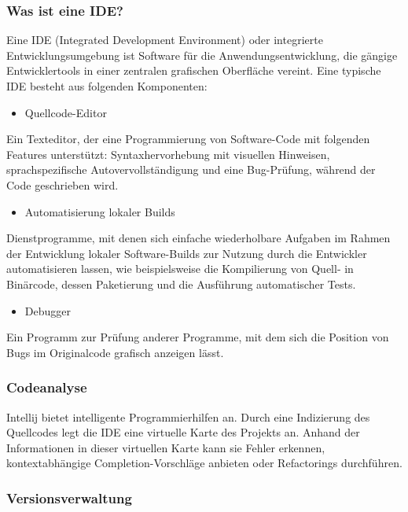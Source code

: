 \subsubsection{Was ist eine IDE?}

Eine IDE (Integrated Development Environment) oder integrierte Entwicklungsumgebung ist Software für die Anwendungsentwicklung, 
die gängige Entwicklertools in einer zentralen grafischen Oberfläche vereint. Eine typische IDE besteht aus folgenden Komponenten:
\cite{sysarch-intellij-2}
\begin{itemize}
 \item Quellcode-Editor 
\end{itemize}
Ein Texteditor, der eine Programmierung von Software-Code mit folgenden Features unterstützt: 
Syntaxhervorhebung mit visuellen Hinweisen, sprachspezifische Autovervollständigung und eine Bug-Prüfung, während der Code geschrieben wird.
\cite{sysarch-intellij-2}
\begin{itemize}
 \item Automatisierung lokaler Builds
\end{itemize}
Dienstprogramme, mit denen sich einfache wiederholbare Aufgaben im Rahmen der Entwicklung lokaler Software-Builds zur Nutzung durch 
die Entwickler automatisieren lassen, wie beispielsweise die Kompilierung von Quell- in Binärcode, dessen Paketierung und die Ausführung automatischer Tests.
\cite{sysarch-intellij-2}
\begin{itemize}
 \item Debugger
\end{itemize}
Ein Programm zur Prüfung anderer Programme, mit dem sich die Position von Bugs im Originalcode grafisch anzeigen lässt.
\cite{sysarch-intellij-2}


\subsubsection{Codeanalyse}

Intellij bietet intelligente Programmierhilfen an. Durch eine Indizierung des Quellcodes legt die IDE eine virtuelle 
Karte des Projekts an. Anhand der Informationen in dieser virtuellen Karte kann sie Fehler erkennen, kontextabhängige Completion-Vorschläge anbieten oder
Refactorings durchführen.
\cite{sysarch-intellij-1}


\subsubsection{Versionsverwaltung}

